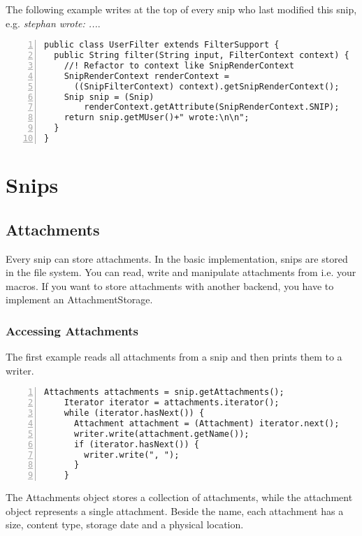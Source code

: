 \documentclass[a4paper,pdftex]{article}
\begin{document}
The following example writes at the top of every snip who last modified this snip,
 e.g. \textit{stephan wrote: ...}.

\begin{Verbatim}[gobble=0,frame=single,numbers=left,fontsize=\small]
public class UserFilter extends FilterSupport {
  public String filter(String input, FilterContext context) {
    //! Refactor to context like SnipRenderContext
    SnipRenderContext renderContext =
      ((SnipFilterContext) context).getSnipRenderContext();
    Snip snip = (Snip)
        renderContext.getAttribute(SnipRenderContext.SNIP);
    return snip.getMUser()+" wrote:\n\n";
  }
}
\end{Verbatim}

\section{Snips}
\subsection{Attachments}

Every snip can store attachments. In the basic implementation, snips are stored
in the file system. You can read, write and manipulate attachments from
i.e. your macros. If you want to store attachments with another backend,
you have to implement an AttachmentStorage.

\subsubsection{Accessing Attachments}

The first example reads all attachments from a snip and then prints them
to a writer.

\begin{Verbatim}[gobble=4,frame=single,numbers=left,fontsize=\small]
    Attachments attachments = snip.getAttachments();
    Iterator iterator = attachments.iterator();
    while (iterator.hasNext()) {
      Attachment attachment = (Attachment) iterator.next();
      writer.write(attachment.getName());
      if (iterator.hasNext()) {
        writer.write(", ");
      }
    }
\end{Verbatim}

The Attachments object stores a collection of attachments, while the attachment object 
represents a single attachment. Beside the name, each attachment has a size, content type, 
storage date and a physical location.
\end{document}
